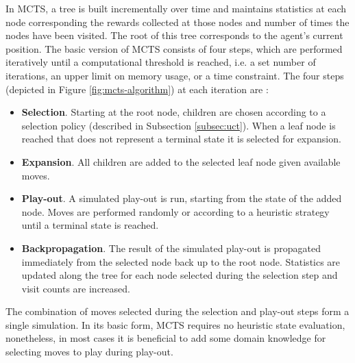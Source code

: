 \documentclass{ecai2010}
\begin{document}
In MCTS, a tree is built incrementally over time and maintains statistics at each node corresponding the rewards collected at those nodes and number of times the nodes have been visited. The root of this tree corresponds to the agent's current position. The basic version of MCTS consists of four steps, which are performed iteratively until a computational threshold is reached, i.e. a set number of iterations, an upper limit on memory usage, or a time constraint. The four steps (depicted in Figure \ref{fig:mcts-algorithm}) at each iteration are \cite{chaslot2008progressive}:
\begin{itemize}
\item {\bf Selection}. Starting at the root node, children are chosen according to a selection policy (described in Subsection \ref{subsec:uct}). When a leaf node is reached that does not represent a terminal state it is selected for expansion.
\item {\bf Expansion}. All children are added to the selected leaf node given available moves.
\item {\bf Play-out}. A simulated play-out is run, starting from the state of the added node. Moves are performed randomly or according to a heuristic strategy until a terminal state is reached.
\item {\bf Backpropagation}. The result of the simulated play-out is propagated immediately from the selected node back up to the root node. Statistics are updated along the tree for each node selected during the selection step and visit counts are increased.
\end{itemize}
The combination of moves selected during the selection and play-out steps form a single simulation. In its basic form, MCTS requires no heuristic state evaluation, nonetheless, in most cases it is beneficial to add some domain knowledge for selecting moves to play during play-out.
\end{document}
